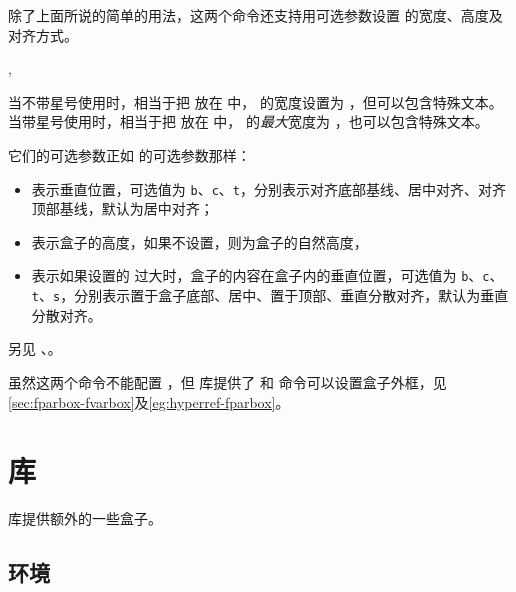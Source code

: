\documentclass[twoside]{book}
\begin{document}
除了上面所说的简单的用法，这两个命令还支持用可选参数设置  的宽度、高度及对齐方式。
\begin{function}[label={HyperRef2,HyperLink2}]{\HyperRef,\HyperLink}
  \begin{syntax}
    \V\HyperRef   {}  
    \V\HyperRef *   
    \V\HyperRef   {}     
    \V\HyperRef *      
  \end{syntax}

当不带星号使用时，相当于把  放在  中， 的宽度设置为 ，但可以包含特殊文本。
当带星号使用时，相当于把  放在  中， 的\emph{最大}宽度为 ，也可以包含特殊文本。

它们的可选参数正如  的可选参数那样：
\begin{itemize}
\item {} 表示垂直位置，可选值为 \texttt{b}、\texttt{c}、\texttt{t}，分别表示对齐底部基线、居中对齐、对齐顶部基线，默认为居中对齐；
\item {} 表示盒子的高度，如果不设置，则为盒子的自然高度，
\item {} 表示如果设置的  过大时，盒子的内容在盒子内的垂直位置，可选值为 \texttt{b}、\texttt{c}、\texttt{t}、\texttt{s}，分别表示置于盒子底部、居中、置于顶部、垂直分散对齐，默认为垂直分散对齐。
\end{itemize}

另见 、。
\end{function}

虽然这两个命令不能配置 ，但  库提供了  和  命令可以设置盒子外框，见\cref{sec:fparbox-fvarbox}及\cref{eg:hyperref-fparbox}。


\section{库}\label{sec:lib-box}

 库提供额外的一些盒子。

\subsection{环境}
\end{document}
